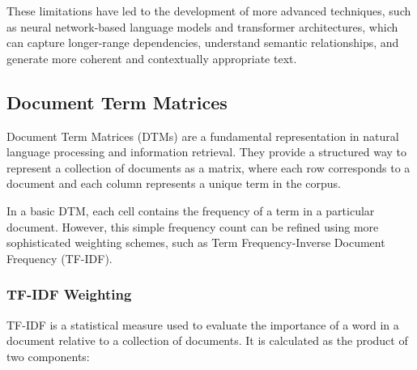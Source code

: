 \documentclass[a4paper, oneside]{discothesis}
\begin{document}

These limitations have led to the development of more advanced techniques, such as neural network-based language models and transformer architectures, which can capture longer-range dependencies, understand semantic relationships, and generate more coherent and contextually appropriate text.

\subsection{Document Term Matrices}
Document Term Matrices (DTMs) are a fundamental representation in natural language processing and information retrieval. They provide a structured way to represent a collection of documents as a matrix, where each row corresponds to a document and each column represents a unique term in the corpus.

In a basic DTM, each cell contains the frequency of a term in a particular document. 
However, this simple frequency count can be refined using more sophisticated weighting schemes, such as Term Frequency-Inverse Document Frequency (TF-IDF).

\subsubsection{TF-IDF Weighting}
TF-IDF is a statistical measure used to evaluate the importance of a word in a document relative to a collection of documents. It is calculated as the product of two components:
\end{document}
